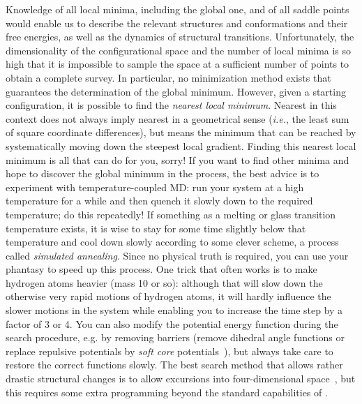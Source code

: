 Knowledge of all local minima, including the global one, and of all
saddle points would enable us to describe the relevant structures and
conformations and their free energies, as well as the dynamics of
structural transitions. Unfortunately, the dimensionality of the
configurational space and the number of local minima is so high that
it is impossible to sample the space at a sufficient number of points
to obtain a complete survey. In particular, no minimization method
exists that guarantees the determination of the global
minimum. However, given a starting configuration, it is possible to
find the {\em nearest local minimum}. Nearest in this context does not
always imply nearest in a geometrical sense ({\em i.e.}, the least sum
of square coordinate differences), but means the minimum that can be
reached by systematically moving down the steepest local
gradient. Finding this nearest local minimum is all that {\gromacs}
can do for you, sorry! If you want to find other minima and hope to
discover the global minimum in the process, the best advice is to
experiment with temperature-coupled MD: run your system at a high
temperature for a while and then quench it slowly down to the required
temperature; do this repeatedly!  If something as a melting or glass
transition temperature exists, it is wise to stay for some time
slightly below that temperature and cool down slowly according to some
clever scheme, a process called {\em simulated annealing}. Since no
physical truth is required, you can use your phantasy to speed up this
process. One trick that often works is to make hydrogen atoms heavier
(mass 10 or so): although that will slow down the otherwise very rapid
motions of hydrogen atoms, it will hardly influence the slower motions
in the system while enabling you to increase the time step by a factor
of 3 or 4. You can also modify the potential energy function during
the search procedure, e.g. by removing barriers (remove dihedral angle
functions or replace repulsive potentials by {\em soft core}
potentials~\cite{Nilges88}), but always take care to restore the
correct functions slowly. The best search method that allows rather
drastic structural changes is to allow excursions into
four-dimensional space~\cite{Schaik93}, but this requires some extra
programming beyond the standard capabilities of {\gromacs}.

